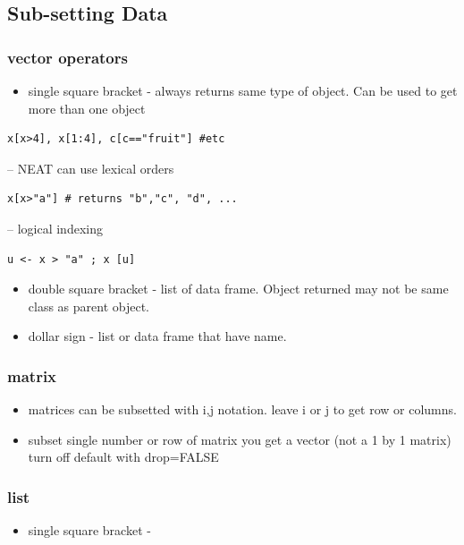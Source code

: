 \documentclass[11pt]{article}
\begin{document}
\subsection{Sub-setting Data}
\label{sec-1-5}
\subsubsection{vector operators}
\label{sec-1-5-1}

\begin{itemize}
\item single square bracket - always returns same type of object. Can be
  used to get more than one object
\end{itemize}

\begin{verbatim}
x[x>4], x[1:4], c[c=="fruit"] #etc
\end{verbatim}
-- NEAT can use lexical orders

\begin{verbatim}
x[x>"a"] # returns "b","c", "d", ...
\end{verbatim}
-- logical indexing

\begin{verbatim}
u <- x > "a" ; x [u]
\end{verbatim}
\begin{itemize}
\item double square bracket - list of data frame. Object returned may not be same class
  as parent object.
\item dollar sign - list or data frame that have name.
\end{itemize}
\subsubsection{matrix}
\label{sec-1-5-2}

\begin{itemize}
\item matrices can be subsetted with i,j notation. leave i or j to get
  row or columns.
\item subset single number or row of matrix you get a vector (not a 1 by 1
  matrix) turn off default with drop=FALSE
\end{itemize}
\subsubsection{list}
\label{sec-1-5-3}

\begin{itemize}
\item single square bracket -
\end{itemize}
\end{document}
